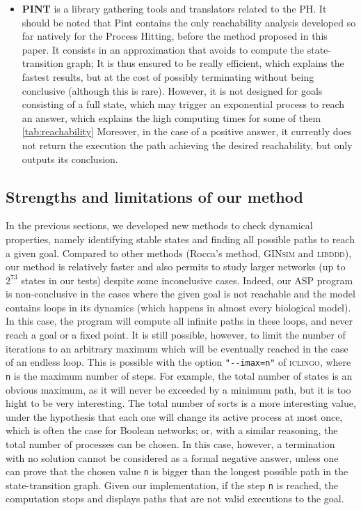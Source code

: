 \begin{itemize}
\item \textbf{PINT}
is a library gathering tools and translators related to the PH.
It should be noted that Pint contains the only reachability analysis
developed so far natively for the Process Hitting,
before the method proposed in this paper.
It consists in an approximation that avoids to compute the state-transition graph;
It is thus ensured to be really efficient, which explains the fastest results,
but at the cost of possibly terminating without being conclusive (although this is rare).
However, it is not designed for goals consisting of a full state, which
may trigger an exponential process to reach an answer,
which explains the high computing times for some of them \ref{tab:reachability}
Moreover, in the case of a positive answer,
it currently does not return the execution the path achieving the desired reachability,
but only outputs its conclusion.
\end{itemize}

\subsection{Strengths and limitations of our method}

In the previous sections,
we developed new methods to check dynamical properties,
namely identifying stable states and finding all possible paths to reach a given goal.
Compared to other methods (Rocca's method, \textsc{GINsim} and \textsc{libddd}),
our method is relatively faster and also permits to study larger networks
(up to $2^{73}$ states in our tests) despite some inconclusive cases.
Indeed, our ASP program is non-conclusive in the cases where the given goal is not
reachable and the model contains loops in its dynamics
(which happens in almost every biological model).
In this case, the program will compute all infinite paths in these loops,
and never reach a goal or a fixed point.
It is still possible, however, to limit the number of iterations to an arbitrary
maximum which will be eventually reached in the case of an endless loop.
This is possible with the option \texttt{"-{}-imax=n"} of \textsc{iclingo},
where \texttt{n} is the maximum number of steps.
For example, the total number of states is an obvious maximum,
as it will never be exceeded by a minimum path,
but it is too hight to be very interesting.
The total number of sorts is a more interesting value,
under the hypothesis that each one will change its active process at most once,
which is often the case for Boolean networks;
or, with a similar reasoning, the total number of processes can be chosen.
In this case, however, a termination with no solution cannot be considered as a formal
negative answer, unless one can prove that the chosen value \texttt{n}
is bigger than the longest possible path in the state-transition graph.
Given our implementation, if the step \texttt{n} is reached,
the computation stops and displays paths that are not valid executions
to the goal.

